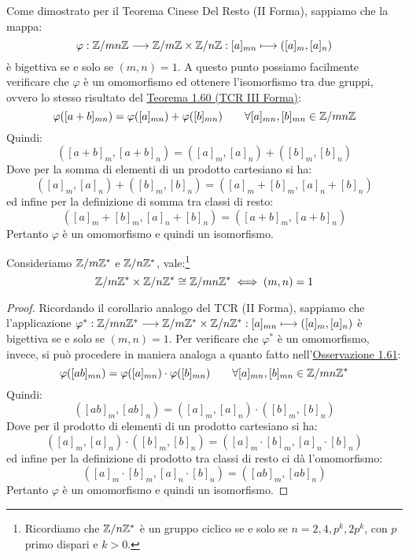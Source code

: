 \documentclass[11pt]{scrartcl}
\begin{document}
\begin{remark}
\label{g:ctr_3'}
Come dimostrato per il Teorema Cinese Del Resto (II Forma), sappiamo che la mappa:
	\[ \varphi : \mathbb Z/mn\mathbb Z \longrightarrow {\mathbb Z}/m{\mathbb Z} \times {\mathbb Z}/n{\mathbb Z} : [a]_{mn} \longmapsto \left([a]_m,[a]_n\right)\]
è bigettiva se e solo se $(m,n)=1$. A questo punto possiamo facilmente verificare che $\varphi$ è un omomorfismo ed ottenere l'isomorfismo tra due gruppi, ovvero lo stesso risultato del \hyperref[g:crt_3]{Teorema 1.60 (TCR III Forma)}:
	\[ \varphi([a+b]_{mn}) = \varphi([a]_{mn}) + \varphi([b]_{mn})
	\qquad
	\forall [a]_{mn}, [b]_{mn} \in \mathbb Z/mn\mathbb Z
	\]
Quindi:
	\[ ([a+b]_m,[a+b]_n) = ([a]_m,[a]_n) + ([b]_m,[b]_n)
	\]
Dove per la somma di elementi di un prodotto cartesiano si ha:
	\[ ([a]_m,[a]_n) + ([b]_m,[b]_n)
	=
	 ([a]_m+[b]_m,[a]_n+[b]_n) 
	\]
ed infine per la definizione di somma tra classi di resto:
	\[ ([a]_m+[b]_m,[a]_n+[b]_n) 
	=
	 ([a+b]_m,[a+b]_n)
	\]
Pertanto $\varphi$ è un omomorfismo e quindi un isomorfismo.
\end{remark}

\begin{corollary}
Consideriamo ${\mathbb Z}/m{\mathbb Z}^*$ e ${\mathbb Z}/n{\mathbb Z}^*$, vale:\footnote{Ricordiamo che $\mathbb Z/n\mathbb Z^*$ è un gruppo ciclico se e solo se $n=2,4,p^k,2p^k$, con $p$ primo dispari e $k>0$.}
	\[ {\mathbb Z}/m{\mathbb Z}^* \times {\mathbb Z}/n{\mathbb Z}^*
	\cong
	\mathbb Z/mn\mathbb Z^*
	\iff
	(m,n)=1
	\]
\end{corollary}

\begin{proof}
Ricordando il corollario analogo del TCR (II Forma), sappiamo che l'applicazione $\varphi^* : \mathbb Z/mn\mathbb Z^* \longrightarrow {\mathbb Z}/m{\mathbb Z}^* \times {\mathbb Z}/n{\mathbb Z}^* : [a]_{mn} \longmapsto \left([a]_m,[a]_n\right)$ è bigettiva se e solo se $(m,n)=1$. Per verificare che $\varphi^*$ è un omomorfismo, invece, si può procedere in maniera analoga a quanto fatto nell'\hyperref[g:ctr_3']{Osservazione 1.61}:
	\[ \varphi([ab]_{mn}) = \varphi([a]_{mn}) \cdot \varphi([b]_{mn})
	\qquad
	\forall [a]_{mn}, [b]_{mn} \in \mathbb Z/mn\mathbb Z^*
	\]
Quindi:
	\[ ([ab]_m,[ab]_n) = ([a]_m,[a]_n) \cdot ([b]_m,[b]_n)
	\]
Dove per il prodotto di elementi di un prodotto cartesiano si ha:
	\[ ([a]_m,[a]_n) \cdot ([b]_m,[b]_n)
	=
	 ([a]_m\cdot [b]_m,[a]_n \cdot [b]_n) 
	\]
ed infine per la definizione di prodotto tra classi di resto ci dà l'omomorfismo:
	\[ ([a]_m \cdot [b]_m,[a]_n \cdot [b]_n) 
	=
	 ([ab]_m,[ab]_n)
	\]
Pertanto $\varphi$ è un omomorfismo e quindi un isomorfismo.
\end{proof}

\newpage
\end{document}
